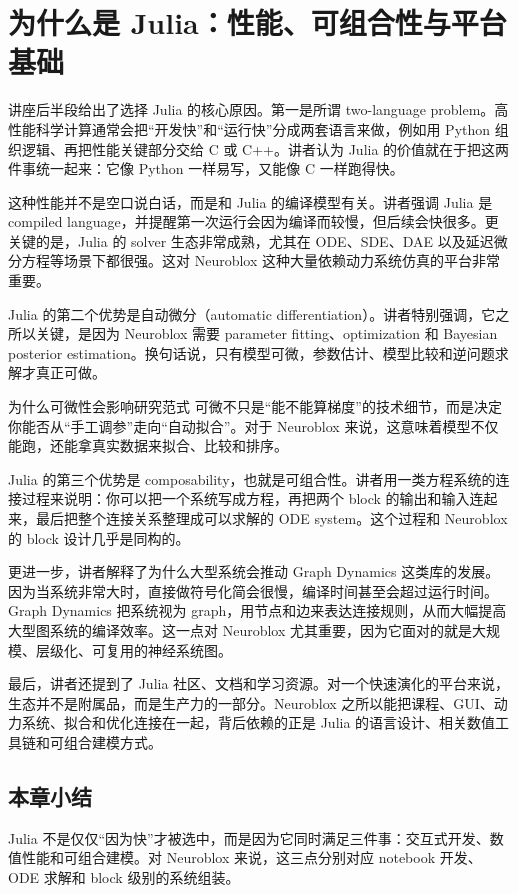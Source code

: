 \documentclass[a4paper]{article}
\begin{document}
\section{为什么是 Julia：性能、可组合性与平台基础}
讲座后半段给出了选择 Julia 的核心原因。第一是所谓 two-language problem。高性能科学计算通常会把“开发快”和“运行快”分成两套语言来做，例如用 Python 组织逻辑、再把性能关键部分交给 C 或 C++。讲者认为 Julia 的价值就在于把这两件事统一起来：它像 Python 一样易写，又能像 C 一样跑得快。

这种性能并不是空口说白话，而是和 Julia 的编译模型有关。讲者强调 Julia 是 compiled language，并提醒第一次运行会因为编译而较慢，但后续会快很多。更关键的是，Julia 的 solver 生态非常成熟，尤其在 ODE、SDE、DAE 以及延迟微分方程等场景下都很强。这对 Neuroblox 这种大量依赖动力系统仿真的平台非常重要。

Julia 的第二个优势是自动微分（automatic differentiation）。讲者特别强调，它之所以关键，是因为 Neuroblox 需要 parameter fitting、optimization 和 Bayesian posterior estimation。换句话说，只有模型可微，参数估计、模型比较和逆问题求解才真正可做。

\begin{knowledgebox}{为什么可微性会影响研究范式}
可微不只是“能不能算梯度”的技术细节，而是决定你能否从“手工调参”走向“自动拟合”。对于 Neuroblox 来说，这意味着模型不仅能跑，还能拿真实数据来拟合、比较和排序。
\end{knowledgebox}

Julia 的第三个优势是 composability，也就是可组合性。讲者用一类方程系统的连接过程来说明：你可以把一个系统写成方程，再把两个 block 的输出和输入连起来，最后把整个连接关系整理成可以求解的 ODE system。这个过程和 Neuroblox 的 block 设计几乎是同构的。

更进一步，讲者解释了为什么大型系统会推动 Graph Dynamics 这类库的发展。因为当系统非常大时，直接做符号化简会很慢，编译时间甚至会超过运行时间。Graph Dynamics 把系统视为 graph，用节点和边来表达连接规则，从而大幅提高大型图系统的编译效率。这一点对 Neuroblox 尤其重要，因为它面对的就是大规模、层级化、可复用的神经系统图。

最后，讲者还提到了 Julia 社区、文档和学习资源。对一个快速演化的平台来说，生态并不是附属品，而是生产力的一部分。Neuroblox 之所以能把课程、GUI、动力系统、拟合和优化连接在一起，背后依赖的正是 Julia 的语言设计、相关数值工具链和可组合建模方式。

\subsection{本章小结}
Julia 不是仅仅“因为快”才被选中，而是因为它同时满足三件事：交互式开发、数值性能和可组合建模。对 Neuroblox 来说，这三点分别对应 notebook 开发、ODE 求解和 block 级别的系统组装。
\end{document}
